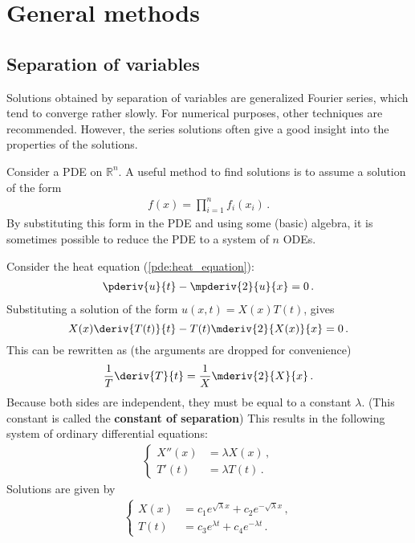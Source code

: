 \section{General methods}
\subsection{Separation of variables}\label{section:separation_of_variables}

    \begin{remark*}
        Solutions obtained by separation of variables are generalized Fourier series, which tend to converge rather slowly. For numerical purposes, other techniques are recommended. However, the series solutions often give a good insight into the properties of the solutions.
    \end{remark*}

    \begin{method}
        Consider a PDE on $\mathbb{R}^n$. A useful method to find solutions is to assume a solution of the form
        \begin{gather}
            f(x) = \prod_{i=1}^nf_i(x_i)\,.
        \end{gather}
        By substituting this form in the PDE and using some (basic) algebra, it is sometimes possible to reduce the PDE to a system of $n$ ODEs.
    \end{method}

    \begin{example}
        Consider the heat equation (\cref{pde:heat_equation}):
        \begin{gather}
            \pderiv{u}{t} - \mpderiv{2}{u}{x} = 0\,.
        \end{gather}
        Substituting a solution of the form $u(x,t) = X(x)T(t)$, gives \[X(x)\deriv{T(t)}{t} - T(t)\mderiv{2}{X(x)}{x} = 0\,.\] This can be rewritten as (the arguments are dropped for convenience) \[\frac{1}{T}\deriv{T}{t} = \frac{1}{X}\mderiv{2}{X}{x}\,.\] Because both sides are independent, they must be equal to a constant $\lambda$. (This constant is called the \textbf{constant of separation}) This results in the following system of ordinary differential equations:
        \begin{gather}
            \begin{cases}
                X''(x) &= \lambda X(x)\,,\\
                T'(t) &= \lambda T(t)\,.
            \end{cases}
        \end{gather}
        Solutions are given by
        \begin{gather}
            \begin{cases}
                X(x) &= c_1e^{\sqrt{\lambda}x}+c_2e^{-\sqrt{\lambda}x}\,,\\
                T(t) &= c_3e^{\lambda t}+c_4e^{-\lambda t}\,.
            \end{cases}
        \end{gather}
    \end{example}


